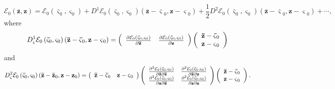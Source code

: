 \documentclass[aps,preprint]{revtex4}%
\begin{document}
\begin{equation}
\mathcal{E}_{0}\left(  \mathbf{\bar{z}},\mathbf{z}\right)  =\mathcal{E}%
_{0}\left(  \mathbf{\bar{\varsigma}}_{0},\mathbf{\varsigma}_{0}\right)
+D^{1}\mathcal{E}_{0}\left(  \mathbf{\bar{\varsigma}}_{0},\mathbf{\varsigma
}_{0}\right)  \left(  \mathbf{\bar{z}-\bar{\varsigma}}_{0},\mathbf{z-\varsigma
}_{0}\right)  +\frac{1}{2}D^{2}\mathcal{E}_{0}\left(  \mathbf{\bar{\varsigma}%
}_{0},\mathbf{\varsigma}_{0}\right)  \left(  \mathbf{\bar{z}-\bar{\varsigma}%
}_{0},\mathbf{z-\varsigma}_{0}\right)  +\cdots,\label{enexp}%
\end{equation}
where
\begin{equation}
D_{\mathbf{\varsigma}}^{1}\mathcal{E}_{0}\left(  \mathbf{\bar{\varsigma}}%
_{0},\mathbf{\varsigma}_{0}\right)  \left(  \mathbf{\bar{z}-\bar{\varsigma}%
}_{0},\mathbf{z-\varsigma}_{0}\right)  =\left(
\begin{array}
[c]{cc}%
\frac{\partial\mathcal{E}_{0}\left(  \mathbf{\bar{\varsigma}}_{0}%
,\mathbf{\varsigma}_{0}\right)  }{\partial\mathbf{\bar{z}}} & \frac
{\partial\mathcal{E}_{0}\left(  \mathbf{\bar{\varsigma}}_{0},\mathbf{\varsigma
}_{0}\right)  }{\partial\mathbf{z}}%
\end{array}
\right)  \left(
\begin{array}
[c]{c}%
\mathbf{\bar{z}-\bar{\varsigma}}_{0}\\
\mathbf{z-\varsigma}_{0}%
\end{array}
\right)
\end{equation}
and
\begin{equation}
D_{\mathbf{\varsigma}}^{2}\mathcal{E}_{0}\left(  \mathbf{\bar{\varsigma}}%
_{0},\mathbf{\varsigma}_{0}\right)  \left(  \mathbf{\bar{z}-\bar{z}}%
_{0},\mathbf{z-z}_{0}\right)  =\left(
\begin{array}
[c]{cc}%
\mathbf{\bar{z}-\bar{\varsigma}}_{0} & \mathbf{z-\varsigma}_{0}%
\end{array}
\right)  \left(
\begin{array}
[c]{cc}%
\frac{\partial^{2}\mathcal{E}_{0}\left(  \mathbf{\bar{\varsigma}}%
_{0},\mathbf{\varsigma}_{0}\right)  }{\partial\mathbf{\bar{z}}\partial
\mathbf{\bar{z}}} & \frac{\partial^{2}\mathcal{E}_{0}\left(  \mathbf{\bar
{\varsigma}}_{0},\mathbf{\varsigma}_{0}\right)  }{\partial\mathbf{\bar{z}%
}\partial\mathbf{z}}\\
\frac{\partial^{2}\mathcal{E}_{0}\left(  \mathbf{\bar{\varsigma}}%
_{0},\mathbf{\varsigma}_{0}\right)  }{\partial\mathbf{z}\partial
\mathbf{\bar{z}}} & \frac{\partial^{2}\mathcal{E}_{0}\left(  \mathbf{\bar
{\varsigma}}_{0},\mathbf{\varsigma}_{0}\right)  }{\partial\mathbf{z}%
\partial\mathbf{z}}%
\end{array}
\right)  \left(
\begin{array}
[c]{c}%
\mathbf{\bar{z}-\bar{\varsigma}}_{0}\\
\mathbf{z-\varsigma}_{0}%
\end{array}
\right)  .
\end{equation}
\end{document}

